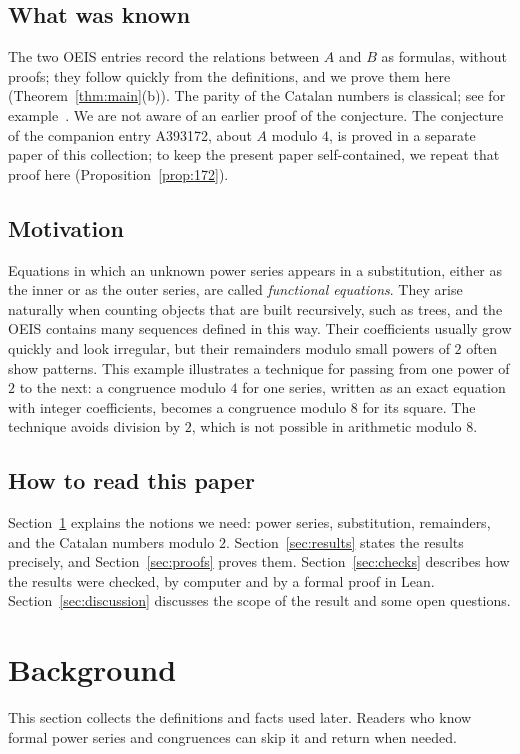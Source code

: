 \documentclass[11pt,a4paper]{article}
\theoremstyle{definition}
\theoremstyle{remark}
\begin{document}
\subsection{What was known}
The two OEIS entries record the relations between $A$ and $B$ as formulas, without proofs; they follow quickly from the
definitions, and we prove them here (Theorem~\ref{thm:main}(b)). The parity of the Catalan numbers is classical; see for
example~\cite{deutschsagan}. We are not aware of an earlier proof of the conjecture. The conjecture of the companion
entry A393172, about $A$ modulo $4$, is proved in a separate paper of this collection; to keep the present paper
self-contained, we repeat that proof here (Proposition~\ref{prop:172}).

\subsection{Motivation}
Equations in which an unknown power series appears in a substitution, either as the inner or as the outer series,
are called \emph{functional equations}. They arise naturally when counting objects that are built recursively, such as trees,
and the OEIS contains many sequences defined in this way. Their coefficients usually grow quickly and look irregular, but
their remainders modulo small powers of $2$ often show patterns. This example illustrates a technique for passing from
one power of $2$ to the next: a congruence modulo $4$ for one series, written as an exact equation with integer
coefficients, becomes a congruence modulo $8$ for its square. The technique avoids division by $2$, which is not
possible in arithmetic modulo $8$.

\subsection{How to read this paper}
Section~\ref{sec:background} explains the notions we need: power series, substitution, remainders, and the Catalan
numbers modulo $2$. Section~\ref{sec:results} states the results precisely, and Section~\ref{sec:proofs} proves them.
Section~\ref{sec:checks} describes how the results were checked, by computer and by a formal proof in Lean.
Section~\ref{sec:discussion} discusses the scope of the result and some open questions.
\section{Background}\label{sec:background}
This section collects the definitions and facts used later. Readers who know formal power series and congruences can skip it and return when needed.
\end{document}
